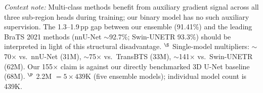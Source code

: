 \documentclass{article}
\begin{document}
\begin{table}[htbp]
\begin{center}
\begin{tabularx}{\textwidth} {
  | >{\raggedright\arraybackslash}X
  | >{\centering\arraybackslash}X
  | >{\centering\arraybackslash}X
  | >{\centering\arraybackslash}X
  | >{\centering\arraybackslash}X
  | }
\end{tabularx}
\end{center}
{\footnotesize \textit{Context note:} Multi-class methods benefit from auxiliary gradient signal across all three sub-region heads during training; our binary model has no such auxiliary supervision. The 1.3--1.9\,pp gap between our ensemble (91.41\%) and the leading BraTS 2021 methods (nnU-Net $\sim$92.7\%; Swin-UNETR 93.3\%) should be interpreted in light of this structural disadvantage.
$^\S$ Single-model multipliers: $\sim$70$\times$ vs.\ nnU-Net (31M), $\sim$75$\times$ vs.\ TransBTS (33M), $\sim$141$\times$ vs.\ Swin-UNETR (62M). Our 155$\times$ claim is against our directly benchmarked 3D U-Net baseline (68M).
$^\P$ 2.2M $= 5 \times 439\text{K}$ (five ensemble models); individual model count is 439K.}
\end{table}
\end{document}
